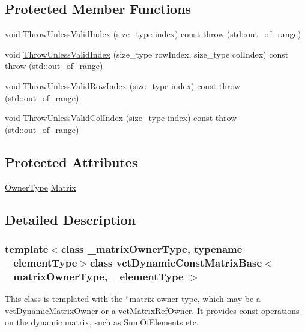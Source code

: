 \subsection*{Protected Member Functions}
\begin{DoxyCompactItemize}
\item 
void \hyperlink{classvct_dynamic_const_matrix_base_a767283d050f4f9d34881ec1af7556f4b}{Throw\+Unless\+Valid\+Index} (size\+\_\+type index) const   throw (std\+::out\+\_\+of\+\_\+range)
\item 
void \hyperlink{classvct_dynamic_const_matrix_base_a89a94602aecdad0d2b33f50925b8f54a}{Throw\+Unless\+Valid\+Index} (size\+\_\+type row\+Index, size\+\_\+type col\+Index) const   throw (std\+::out\+\_\+of\+\_\+range)
\item 
void \hyperlink{classvct_dynamic_const_matrix_base_a3efffdbb50c547a542272f18b43cedd3}{Throw\+Unless\+Valid\+Row\+Index} (size\+\_\+type index) const   throw (std\+::out\+\_\+of\+\_\+range)
\item 
void \hyperlink{classvct_dynamic_const_matrix_base_a2c9f6345316049ee1c7849b2d04fcf68}{Throw\+Unless\+Valid\+Col\+Index} (size\+\_\+type index) const   throw (std\+::out\+\_\+of\+\_\+range)
\end{DoxyCompactItemize}
\subsection*{Protected Attributes}
\begin{DoxyCompactItemize}
\item 
\hyperlink{classvct_dynamic_const_matrix_base_a2e37ebc2ac741d4346d21f986e625e96}{Owner\+Type} \hyperlink{classvct_dynamic_const_matrix_base_a46173996e3b23fd3dec1ff901a56b60c}{Matrix}
\end{DoxyCompactItemize}


\subsection{Detailed Description}
\subsubsection*{template$<$class \+\_\+matrix\+Owner\+Type, typename \+\_\+element\+Type$>$class vct\+Dynamic\+Const\+Matrix\+Base$<$ \+\_\+matrix\+Owner\+Type, \+\_\+element\+Type $>$}

This class is templated with the ``matrix owner type\textquotesingle{}\textquotesingle{}, which may be a \hyperlink{classvct_dynamic_matrix_owner}{vct\+Dynamic\+Matrix\+Owner} or a vct\+Matrix\+Ref\+Owner. It provides const operations on the dynamic matrix, such as Sum\+Of\+Elements etc.

